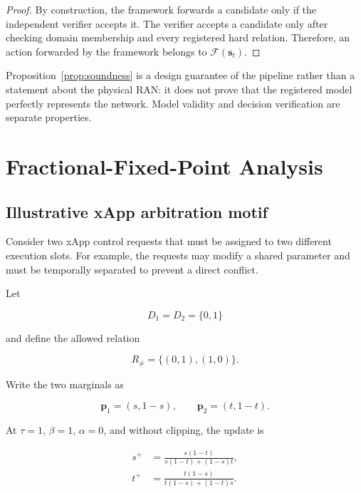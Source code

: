 \documentclass[pdflatex,sn-mathphys-num,iicol,oneside]{sn-jnl}
\begin{document}
\begin{proof}
By construction, the framework forwards a candidate only if the
independent verifier accepts it. The verifier accepts a candidate
only after checking domain membership and every registered hard
relation. Therefore, an action forwarded by the framework belongs to
$\mathcal{F}(\bm{s}_t)$.
\end{proof}

Proposition~\ref{prop:soundness} is a design guarantee of the
pipeline rather than a statement about the physical RAN: it does not
prove that the registered model perfectly represents the network.
Model validity and decision verification are separate properties.

\section{Fractional-Fixed-Point Analysis}
\label{sec:analysis}

\subsection{Illustrative xApp arbitration motif}

Consider two xApp control requests that must be assigned to two
different execution slots. For example, the requests may modify a
shared parameter and must be temporally separated to prevent a direct
conflict.

Let

\begin{equation}
D_1=D_2=\{0,1\}
\end{equation}

and define the allowed relation

\begin{equation}
R_{\neq}
=
\{(0,1),(1,0)\}.
\end{equation}

Write the two marginals as

\begin{equation}
\bm{p}_1=(s,1-s),
\qquad
\bm{p}_2=(t,1-t).
\end{equation}

At $\tau=1$, $\beta=1$, $\alpha=0$, and without clipping, the update
is

\begin{align}
s^{+}
&=
\frac{s(1-t)}
{s(1-t)+(1-s)t},
\label{eq:s-update}
\\
t^{+}
&=
\frac{t(1-s)}
{t(1-s)+(1-t)s}.
\label{eq:t-update}
\end{align}
\end{document}
